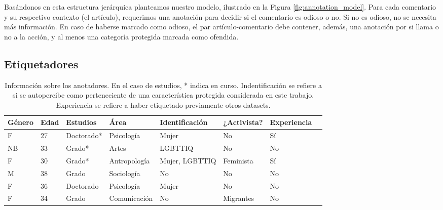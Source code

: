 Basándonos en esta estructura jerárquica planteamos nuestro modelo, ilustrado en la Figura \ref{fig:annotation_model}. Para cada comentario y su respectivo contexto (el artículo), requerimos una anotación para decidir si el comentario es odioso o no. Si no es odioso, no se necesita más información. En caso de haberse marcado como odioso, el par artículo-comentario debe contener, además, una anotación por si llama o no a la acción, y al menos una categoría protegida marcada como ofendida.


\subsection{Etiquetadores}

%
%

\begin{table}[b]
    \centering
    \small
    \begin{tabularx}{\textwidth}{l l l l l l l l}
        Género& Edad  & Estudios    & Área          & Identificación    & ¿Activista?   & Experiencia\\
        \hline
        F    & 27     & Doctorado*  & Psicología    & Mujer             & No                   & Sí         \\
        NB   & 33     & Grado*      & Artes         & LGBTTIQ           & No                   & No         \\
        F    & 30     & Grado*      & Antropología  & Mujer, LGBTTIQ    & Feminista            & Sí         \\
        M    & 38     & Grado       & Sociología    & No                & No                   & No         \\
        F    & 36     & Doctorado   & Psicología    & Mujer             & No                   & No         \\
        F    & 34     & Grado       & Comunicación  & No                & Migrantes            & No         \\
        \hline
    \end{tabularx}
    \caption{Información sobre los anotadores. En el caso de estudios, * indica en curso. Indentificación se refiere a si se autopercibe como perteneciente de una característica protegida considerada en este trabajo. Experiencia se refiere a haber etiquetado previamente otros datasets. }
    \label{tab:informacion_sobre_anotadores}
\end{table}

